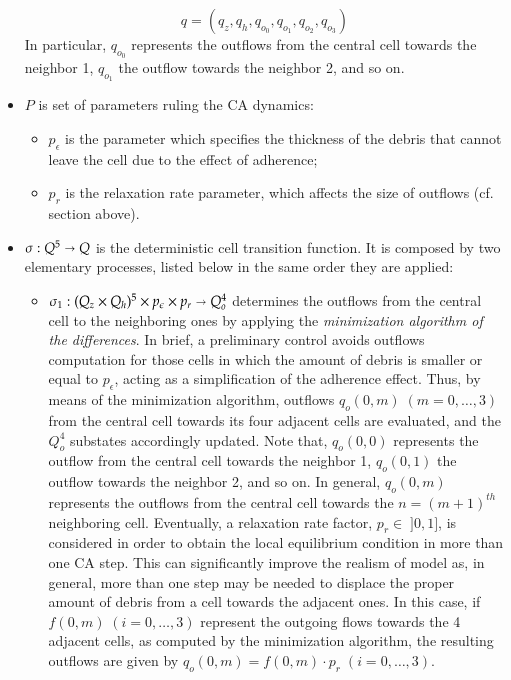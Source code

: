 \begin{itemize}
$$ q = (q_z, q_h, q_{o_0}, q_{o_1}, q_{o_2}, q_{o_3})$$
In particular, $q_{o_0}$ represents the outflows from the central cell towards the neighbor 1, $q_{o_1}$ the outflow towards the neighbor 2, and so on.

\item   $P$ is set of parameters ruling the CA dynamics:

\begin{itemize}
    \item   $p_\epsilon$ is the parameter which specifies the thickness of the debris that cannot leave the cell due to the effect of adherence;
    \item   $p_r$ is the relaxation rate parameter, which affects the size of outflows (cf. section above).
\end{itemize}

\item $\sigma : Q^5 \shortrightarrow Q$ is the deterministic cell
  transition function. It is composed by two elementary processes,
  listed below in the same order they are applied:
\begin{itemize}
\item $\sigma_1 : (Q_z \times Q_h)^5 \times p_\epsilon \times
  p_r\shortrightarrow Q_o^4$ determines the outflows from the central
  cell to the neighboring ones by applying the \emph{minimization
    algorithm of the differences}. In brief, a preliminary control
  avoids outflows computation for those cells in which the amount of
  debris is smaller or equal to $p_\epsilon$, acting as a
  simplification of the adherence effect. Thus, by means of the
  minimization algorithm, outflows $q_o(0,m) \; (m=0,\ldots,3)$ from
  the central cell towards its four adjacent cells are evaluated, and
  the $Q_o^4$ substates accordingly updated. Note that, $q_o(0,0)$
  represents the outflow from the central cell towards the neighbor
  1, $q_o(0,1)$ the outflow towards the neighbor 2, and so on. In
  general, $q_o(0,m)$ represents the outflows from the central cell
  towards the $n=(m+1)^{th}$ neighboring cell. Eventually, a
  relaxation rate factor, $p_r \in \; ]0,1]$, is considered in order
      to obtain the local equilibrium condition in more than one CA
      step. This can significantly improve the realism of model as, in
      general, more than one step may be needed to displace the proper
      amount of debris from a cell towards the adjacent ones. In this
      case, if $f(0,m) \; (i=0, \ldots, 3)$ represent the outgoing
      flows towards the 4 adjacent cells, as computed by the
      minimization algorithm, the resulting outflows are given by
      $q_o(0,m)=f(0,m) \cdot p_r \; (i=0, \ldots, 3)$.


\end{itemize}
\end{itemize}
